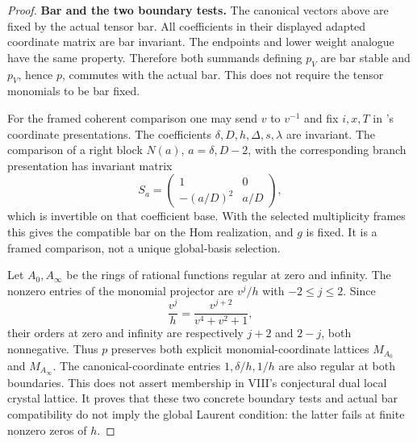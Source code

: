 \begin{proof}
\par\smallskip\noindent\textbf{Bar and the two boundary tests.}\quad
The canonical vectors above are fixed by the actual tensor bar.
All coefficients in their displayed adapted coordinate matrix
are bar invariant. The endpoints and lower weight analogue
have the same property. Therefore both summands defining $p_V$
are bar stable and $p_V$, hence $p$, commutes with the actual bar.
This does not require the tensor monomials to be bar fixed.

For the framed coherent comparison one may send $v$ to $v^{-1}$
and fix $i,x,T$ in 's coordinate presentations.
The coefficients $\delta,D,h,\Delta,s,\lambda$ are invariant.
The comparison of a right block $N(a)$, $a=\delta,D-2$, with
the corresponding branch presentation has invariant matrix
\[
 S_a=\begin{pmatrix}1&0\\-(a/D)^2&a/D\end{pmatrix},
\]
which is invertible on that coefficient base.
With the selected multiplicity frames this gives the compatible
bar on the Hom realization, and $g$ is fixed.
It is a framed comparison, not a unique global-basis selection.

Let $A_0,A_\infty$ be the rings of rational functions regular
at zero and infinity. The nonzero entries of the monomial
projector are $v^j/h$ with $-2\leq j\leq2$.
Since
\[
 \frac{v^j}{h}=\frac{v^{j+2}}{v^4+v^2+1},
\]
their orders at zero and infinity are respectively $j+2$
and $2-j$, both nonnegative. Thus $p$ preserves both explicit
monomial-coordinate lattices $M_{A_0}$ and $M_{A_\infty}$.
The canonical-coordinate entries $1,\delta/h,1/h$ are also
regular at both boundaries.
This does not assert membership in VIII's conjectural dual
local crystal lattice. It proves that these two concrete
boundary tests and actual bar compatibility do not imply
the global Laurent condition: the latter fails at finite
nonzero zeros of $h$.


\end{proof}
